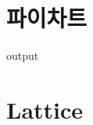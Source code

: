 \section{파이차트}




\begin{Schunk}
\begin{Soutput}
output
\end{Soutput}
\end{Schunk}


\section{Lattice}

